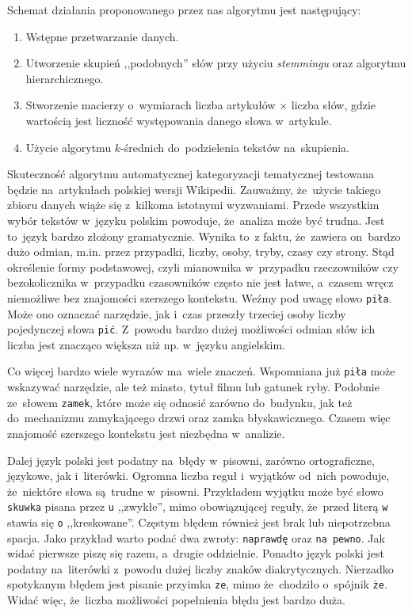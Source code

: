 \documentclass{praca1}
\begin{document}
Schemat działania proponowanego przez nas algorytmu jest następujący:
\begin{enumerate}
\item Wstępne przetwarzanie danych.
\item Utworzenie skupień ,,podobnych'' słów przy użyciu \emph{stemmingu} oraz algorytmu hierarchicznego.
\item Stworzenie macierzy o~wymiarach liczba artykułów $\times$ liczba słów, gdzie wartością jest liczność występowania danego słowa w~artykule.
\item Użycie algorytmu $k$-średnich do~podzielenia tekstów na~skupienia.
\end{enumerate}

Skuteczność algorytmu automatycznej kategoryzacji tematycznej testowana będzie na~artykułach polskiej wersji Wikipedii. Zauważmy, że~użycie takiego zbioru danych wiąże się z~kilkoma istotnymi wyzwaniami. Przede wszystkim wybór tekstów w~języku polskim powoduje, że~analiza może być trudna. Jest to~język bardzo złożony gramatycznie. Wynika to~z faktu, że~zawiera on~bardzo dużo odmian, m.in. przez przypadki, liczby, osoby, tryby, czasy czy strony. Stąd określenie formy podstawowej, czyli mianownika w~przypadku rzeczowników czy bezokolicznika w~przypadku czasowników często nie jest łatwe, a~czasem wręcz niemożliwe bez znajomości szerszego kontekstu. Weźmy pod uwagę słowo \verb|piła|. Może ono oznaczać narzędzie, jak i~czas przeszły trzeciej osoby liczby pojedynczej słowa \verb|pić|. Z~powodu bardzo dużej możliwości odmian słów ich liczba jest znacząco większa niż np. w~języku angielskim. 

Co więcej bardzo wiele wyrazów ma~wiele znaczeń. Wspomniana już \verb|piła| może wskazywać narzędzie, ale też miasto, tytuł filmu lub gatunek ryby. Podobnie ze~słowem \verb|zamek|, które może się odnosić zarówno do~budynku, jak też do~mechanizmu zamykającego drzwi oraz zamka błyskawicznego. Czasem więc znajomość szerszego kontekstu jest niezbędna w~analizie.

Dalej język polski jest podatny na~błędy w~pisowni, zarówno ortograficzne, językowe, jak i~literówki. Ogromna liczba reguł i~wyjątków od~nich powoduje, że~niektóre słowa są~trudne w~pisowni. Przykładem wyjątku może być słowo \verb|skuwka| pisana przez \verb|u| ,,zwykłe'', mimo obowiązującej reguły, że~przed literą \verb|w| stawia się \verb|o| ,,kreskowane''. Częstym błędem również jest brak lub niepotrzebna spacja. Jako przykład warto podać dwa zwroty: \verb|naprawdę| oraz \verb|na pewno|. Jak widać pierwsze piszę się razem, a~drugie oddzielnie. Ponadto język polski jest podatny na~literówki z~powodu dużej liczby znaków diakrytycznych. Nierzadko spotykanym błędem jest pisanie przyimka \verb|ze|, mimo że~chodziło o~spójnik \verb|że|. Widać więc, że~liczba możliwości popełnienia błędu jest bardzo duża.
\end{document}
